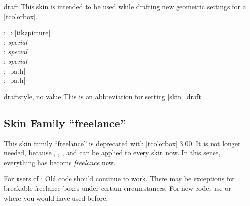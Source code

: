 \begin{docSkin}{draft}
  This skin is intended to be used while drafting new geometric settings
  for a |tcolorbox|.
\begin{tcolorbox}[skintable=draft]
  \begin{tabbing}
    : \=\kill
    :  \> |tikzpicture|\\ 
    :           \> \emph{special}\\
    : \> \emph{special}\\ 
    :        \> \emph{special}\\
    :    \> |path|\\
    :           \> |path|
  \end{tabbing}
\end{tcolorbox}
\end{docSkin}

\begin{docTcbKey}{draft}{}{style, no value}
  This is an abbreviation for setting |skin=draft|.
\end{docTcbKey}


\begin{dispExample}
\end{dispExample}



\begin{dispExample}
\vspace*{3mm}
\begin{tcolorbox}[draft,title=A colored box with the \enquote{draft} skin]
\lipsum[1-3]
\tcblower
\lipsum[4-6]
\end{tcolorbox}
\end{dispExample}



\clearpage
\subsection{Skin Family \enquote{freelance}}
\begin{marker}
This skin family \enquote{freelance} is deprecated with |tcolorbox| 3.00.
It is not longer needed, because
,
,
, and
can be applied to every skin now. In this sense, everything has become
\emph{freelance} now.\par
For users of : Old code should continue to work. There may be
exceptions for breakable freelance boxes under certain circumstances.
For new code, use  or  where
you would have used  before.
\end{marker}

